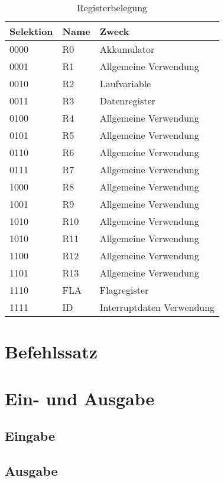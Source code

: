 \begin{table}[h]
\centering
\begin{tabular}{lll}
\toprule
Selektion & Name & Zweck\\
\midrule
0000 & R0  & Akkumulator\\
0001 & R1  & Allgemeine Verwendung\\
0010 & R2  & Laufvariable\\
0011 & R3  & Datenregister\\
0100 & R4  & Allgemeine Verwendung\\
0101 & R5  & Allgemeine Verwendung\\
0110 & R6  & Allgemeine Verwendung\\
0111 & R7  & Allgemeine Verwendung\\
1000 & R8  & Allgemeine Verwendung\\
1001 & R9  & Allgemeine Verwendung\\
1010 & R10 & Allgemeine Verwendung\\
1010 & R11 & Allgemeine Verwendung\\
1100 & R12 & Allgemeine Verwendung\\
1101 & R13 & Allgemeine Verwendung\\
1110 & FLA & Flagregister\\
1111 & ID  & Interruptdaten Verwendung\\
\bottomrule
\end{tabular}
\caption{Registerbelegung}
\label{tab:registerbelegung}
\end{table}
\clearpage
\section{Befehlssatz}
\section{Ein- und Ausgabe}
\subsection{Eingabe}
\subsection{Ausgabe}
